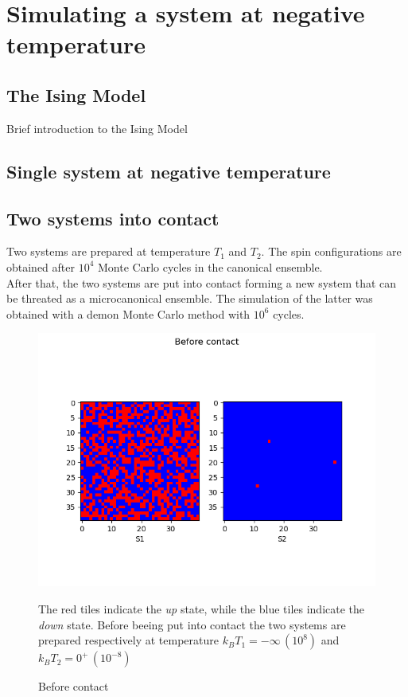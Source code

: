\chapter{Simulating a system at negative temperature}

\section{The Ising Model}
Brief introduction to the Ising Model

\section{Single system at negative temperature}

\section{Two systems into contact}
Two systems are prepared at temperature $T_1$ and $T_2$. The spin configurations are obtained after $10^4$ Monte Carlo cycles in the canonical ensemble. \\
After that, the two systems are put into contact forming a new system that can be threated as a microcanonical ensemble. The simulation of the latter was obtained with a 
demon Monte Carlo method with $10^6$ cycles.

\begin{figure}[h]
    \centering
    \includegraphics[scale=0.7]{./images/T1_T2_before.png}
    \caption{Before contact}{The red tiles indicate the \emph{up} state, while the blue tiles indicate the \emph{down} state. Before beeing put into contact
    the two systems are prepared respectively at temperature $k_B T_1 = -\infty \, (10^8)$ and $k_B T_2 = 0^+ \, (10^{-8})$}
    \label{fig:before}
\end{figure}

